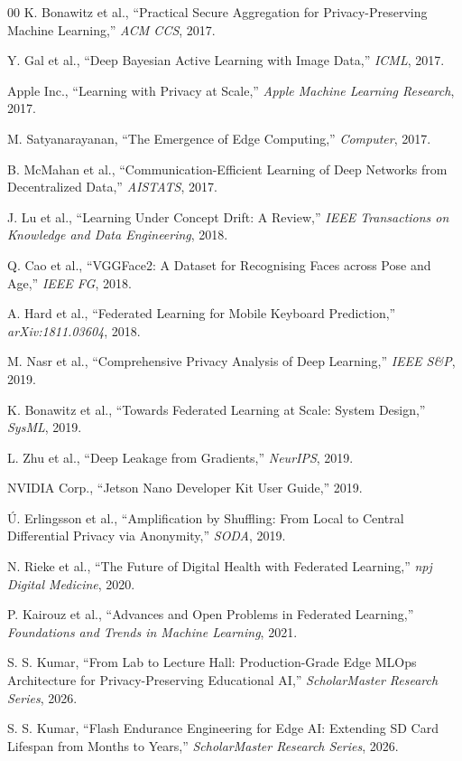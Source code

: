 \documentclass[conference]{IEEEtran}
\begin{document}
\begin{thebibliography}{00}
 K. Bonawitz et al., ``Practical Secure Aggregation for Privacy-Preserving Machine Learning,'' \textit{ACM CCS}, 2017.

 Y. Gal et al., ``Deep Bayesian Active Learning with Image Data,'' \textit{ICML}, 2017.


 Apple Inc., ``Learning with Privacy at Scale,'' \textit{Apple Machine Learning Research}, 2017.

 M. Satyanarayanan, ``The Emergence of Edge Computing,'' \textit{Computer}, 2017.

 B. McMahan et al., ``Communication-Efficient Learning of Deep Networks from Decentralized Data,'' \textit{AISTATS}, 2017.

 J. Lu et al., ``Learning Under Concept Drift: A Review,'' \textit{IEEE Transactions on Knowledge and Data Engineering}, 2018.

 Q. Cao et al., ``VGGFace2: A Dataset for Recognising Faces across Pose and Age,'' \textit{IEEE FG}, 2018.


 A. Hard et al., ``Federated Learning for Mobile Keyboard Prediction,'' \textit{arXiv:1811.03604}, 2018.

 M. Nasr et al., ``Comprehensive Privacy Analysis of Deep Learning,'' \textit{IEEE S\&P}, 2019.


 K. Bonawitz et al., ``Towards Federated Learning at Scale: System Design,'' \textit{SysML}, 2019.

 L. Zhu et al., ``Deep Leakage from Gradients,'' \textit{NeurIPS}, 2019.


 NVIDIA Corp., ``Jetson Nano Developer Kit User Guide,'' 2019.

 Ú. Erlingsson et al., ``Amplification by Shuffling: From Local to Central Differential Privacy via Anonymity,'' \textit{SODA}, 2019.

 N. Rieke et al., ``The Future of Digital Health with Federated Learning,'' \textit{npj Digital Medicine}, 2020.

 P. Kairouz et al., ``Advances and Open Problems in Federated Learning,'' \textit{Foundations and Trends in Machine Learning}, 2021.

 S. S. Kumar, ``From Lab to Lecture Hall: Production-Grade Edge MLOps Architecture for Privacy-Preserving Educational AI,'' \textit{ScholarMaster Research Series}, 2026.

 S. S. Kumar, ``Flash Endurance Engineering for Edge AI: Extending SD Card Lifespan from Months to Years,'' \textit{ScholarMaster Research Series}, 2026.


\end{thebibliography}
\end{document}
